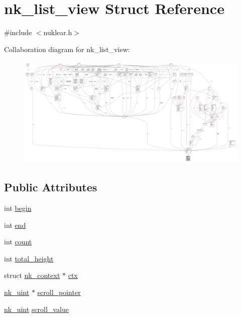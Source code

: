 \hypertarget{structnk__list__view}{}\section{nk\+\_\+list\+\_\+view Struct Reference}
\label{structnk__list__view}


{\ttfamily \#include $<$nuklear.\+h$>$}



Collaboration diagram for nk\+\_\+list\+\_\+view\+:
\nopagebreak
\begin{figure}[H]
\begin{center}
\leavevmode
\includegraphics[width=350pt]{structnk__list__view__coll__graph}
\end{center}
\end{figure}
\subsection*{Public Attributes}
\begin{DoxyCompactItemize}
\item 
int \mbox{\hyperlink{structnk__list__view_aa4879e58fcd4a3d28bd7bff09cdf5624}{begin}}
\item 
int \mbox{\hyperlink{structnk__list__view_a5f53b59714337769b991392a24ef64f7}{end}}
\item 
int \mbox{\hyperlink{structnk__list__view_a665f64779d41052ee4a203b9ae785e8e}{count}}
\item 
int \mbox{\hyperlink{structnk__list__view_ae912b372c49b234cac66f8c3232f8af6}{total\+\_\+height}}
\item 
struct \mbox{\hyperlink{structnk__context}{nk\+\_\+context}} $\ast$ \mbox{\hyperlink{structnk__list__view_aeb23229308cd613e95cf1164f26ab8f9}{ctx}}
\item 
\mbox{\hyperlink{nuklear_8h_a951b598a3101b6d2a55d22ac39f57919}{nk\+\_\+uint}} $\ast$ \mbox{\hyperlink{structnk__list__view_ac00e7a4b62ad7c6b8d244248db2a0175}{scroll\+\_\+pointer}}
\item 
\mbox{\hyperlink{nuklear_8h_a951b598a3101b6d2a55d22ac39f57919}{nk\+\_\+uint}} \mbox{\hyperlink{structnk__list__view_a2090ced9c850ad0ee1ac6e88d8d9a82d}{scroll\+\_\+value}}
\end{DoxyCompactItemize}



